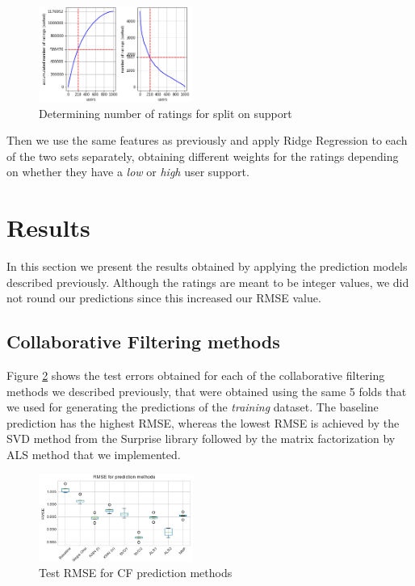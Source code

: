 \documentclass[10pt,conference,compsocconf]{IEEEtran}
\begin{document}
    \begin{figure}[htp]
      \centering
      \includegraphics[width=0.45\textwidth]{histo}
      \caption{Determining number of ratings for split on support}
      \label{fig:histo}
    \end{figure}

    Then we use the same features as previously and apply Ridge Regression to each of the two sets separately, obtaining different weights for the ratings depending on whether they have a \emph{low} or \emph{high} user support.

\section{Results}
\label{sec:results}
  In this section we present the results obtained by applying the prediction models described previously. Although the ratings are meant to be integer values, we did not round our predictions since this increased our RMSE value.
  \subsection{Collaborative Filtering methods} %
  \label{sub:individual_cf_methods}
    Figure \ref{fig:RMSECF} shows the test errors obtained for each of the collaborative filtering methods we described previously, that were obtained using the same 5 folds that we used for generating the predictions of the \emph{training} dataset.
    The baseline prediction has the highest RMSE, whereas the lowest RMSE is achieved by the SVD method from the Surprise library followed by the matrix factorization by ALS method that we implemented.

    \begin{figure}[htp]
      \centering
      \includegraphics[width=0.45\textwidth]{RMSECF}
      \caption{Test RMSE for CF prediction methods}
      \label{fig:RMSECF}
    \end{figure}
\end{document}
